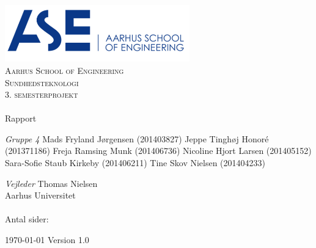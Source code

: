 \begin{titlingpage}
\begin{center}

~ \\[3cm]

\includegraphics[width=0.6\textwidth]{figurer/ASE}~\\[1cm]

\textsc{\LARGE Aarhus School of Engineering}\\[1.5cm]

\textsc{\Large Sundhedsteknologi}\\
\textsc{\Large 3. semesterprojekt}\\[0.5cm]

\noindent\makebox[\linewidth]{\rule{\textwidth}{0.4pt}}\\
[0.5cm]{\Huge Rapport}
\noindent\makebox[\linewidth]{\rule{\textwidth}{0.4pt}}

\end{center}

\textit{Gruppe 4} \newline
Mads Fryland J\o rgensen (201403827) \newline
Jeppe Tingh\o j Honoré (201371186) \newline
Freja Ramsing Munk (201406736) \newline		 
Nicoline Hjort Larsen (201405152) \newline 
Sara-Sofie Staub Kirkeby (201406211) \newline
Tine Skov Nielsen (201404233) \newline


\textit{Vejleder} \newline
Thomas Nielsen\\
Aarhus Universitet
\\
\\
Antal sider: \pageref{LastPage}


\vfill

\begin{center}
{\large \today}
Version 1.0
\end{center}


\end{titlingpage}